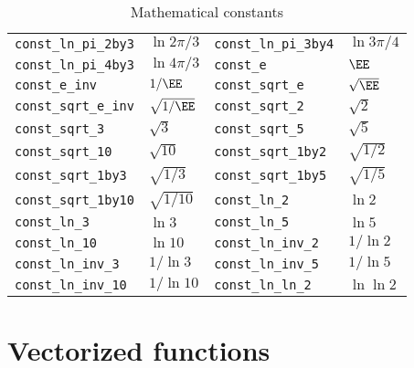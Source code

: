 \begin{table}
\begin{tabularx}{\textwidth}{p{1.25in}Lp{1.25in}L}
    \texttt{const\_ln\_pi\_2by3}   & $\ln{2\pi/3}$   &
    \texttt{const\_ln\_pi\_3by4}   & $\ln{3\pi/4}$   \\
    \texttt{const\_ln\_pi\_4by3}   & $\ln{4\pi/3}$   &
    \texttt{const\_e}              & $\EE$           \\
    \texttt{const\_e\_inv}         & $1/\EE$         &
    \texttt{const\_sqrt\_e}        & $\sqrt{\EE}$    \\
    \texttt{const\_sqrt\_e\_inv}   & $\sqrt{1/\EE}$  &
    \texttt{const\_sqrt\_2}        & $\sqrt{2}$      \\
    \texttt{const\_sqrt\_3}        & $\sqrt{3}$      &
    \texttt{const\_sqrt\_5}        & $\sqrt{5}$      \\
    \texttt{const\_sqrt\_10}       & $\sqrt{10}$     &
    \texttt{const\_sqrt\_1by2}     & $\sqrt{1/2}$    \\
    \texttt{const\_sqrt\_1by3}     & $\sqrt{1/3}$    &
    \texttt{const\_sqrt\_1by5}     & $\sqrt{1/5}$    \\
    \texttt{const\_sqrt\_1by10}    & $\sqrt{1/10}$   &
    \texttt{const\_ln\_2}          & $\ln{2}$        \\
    \texttt{const\_ln\_3}          & $\ln{3}$        &
    \texttt{const\_ln\_5}          & $\ln{5}$        \\
    \texttt{const\_ln\_10}         & $\ln{10}$       &
    \texttt{const\_ln\_inv\_2}     & $1/\ln{2}$      \\
    \texttt{const\_ln\_inv\_3}     & $1/\ln{3}$      &
    \texttt{const\_ln\_inv\_5}     & $1/\ln{5}$      \\
    \texttt{const\_ln\_inv\_10}    & $1/\ln{10}$     &
    \texttt{const\_ln\_ln\_2}      & $\ln\ln{2}$     \\
    \bottomrule
  \end{tabularx}
  \caption{Mathematical constants}
  \label{tab:Mathematical constants}
\end{table}

\clearpage

\section{Vectorized functions}
\label{sec:Vectorized functions}

